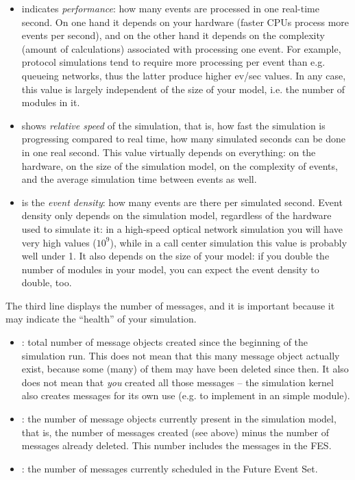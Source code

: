 \begin{itemize}
   \item {} indicates \textit{performance}: how many events are
     processed in one real-time second.  On one hand it depends on your hardware
     (faster CPUs process more events per second), and on the other hand
     it depends on the complexity (amount of calculations) associated
     with processing one event. For example, protocol simulations tend to require
     more processing per event than e.g. queueing networks, thus the latter
     produce higher ev/sec values. In any case, this value is largely
     independent of the size of your model, i.e. the number of modules in it.
   \item {} shows \textit{relative speed} of the simulation, that
     is, how fast the simulation is progressing compared to real time, how many
     simulated seconds can be done in one real second. This value virtually depends
     on everything: on the hardware, on the size of the simulation model,
     on the complexity of events, and the average simulation time between events as well.
   \item {} is the \textit{event density}: how many events are
     there per simulated second. Event density only depends on the simulation model,
     regardless of the hardware used to simulate it: in a high-speed
     optical network simulation you will have very high values ($10^9$),
     while in a call center simulation this value is probably well
     under 1. It also depends on the size of your model: if you double the
     number of modules in your model, you can expect the event density to
     double, too.
\end{itemize}

The third line displays the number of messages, and it is important
because it may indicate the ``health'' of your simulation.

\begin{itemize}
   \item{: total number of message objects created since the
     beginning of the simulation run. This does not mean that this many message
     object actually exist, because some (many) of them may have been deleted
     since then. It also does not mean that \textit{you} created all those
     messages -- the simulation kernel also creates messages for its own use
     (e.g. to implement  in an  simple module).}
   \item{: the number of message objects currently present
     in the simulation model, that is, the number of messages created (see above)
     minus the number of messages already deleted. This number includes
     the messages in the FES.}
   \item{: the number of messages currently scheduled in the
     Future Event Set.}
\end{itemize}


